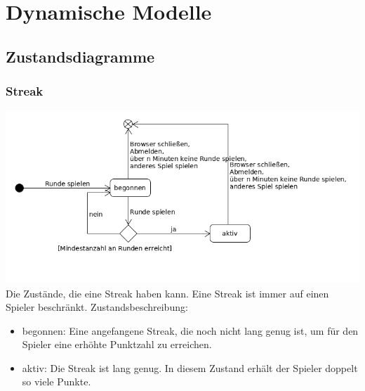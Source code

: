 \documentclass[a4paper]{scrreprt}
\begin{document}
    \chapter{Dynamische Modelle}
    \section{Zustandsdiagramme}
    \subsection{Streak}
    \label{fig:Streak_State}
    \includegraphics[width=\textwidth]{uml/export/Streak_Zustand.png}
    Die Zustände, die eine Streak haben kann. Eine Streak ist immer auf einen \Gls{Spieler} beschränkt.
    Zustandsbeschreibung:
    \begin{itemize}
    \item begonnen: Eine angefangene Streak, die noch nicht lang genug ist, um für den \Gls{Spieler} eine erhöhte Punktzahl zu erreichen.
    \item aktiv: Die Streak ist lang genug. In diesem Zustand erhält der \Gls{Spieler} doppelt so viele Punkte.
    \end{itemize}
\end{document}
